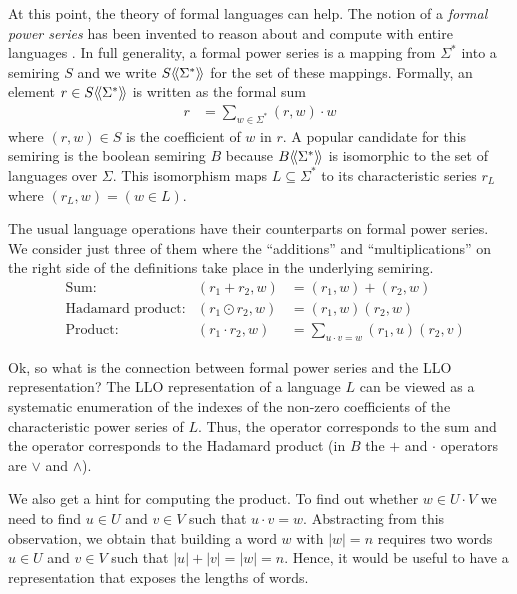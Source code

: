 At this point, the theory of formal languages can help. The notion of
a \emph{formal power series} has been invented to reason about and
compute with entire languages \cite{DBLP:books/daglib/0067812,DBLP:books/sp/KuichS86}. In full
generality, a formal power series is a mapping from $\Sigma^*$ into a
semiring $S$ and we write $S\langle\!\langle\Sigma^*\rangle\!\rangle$ for the set of these
mappings. Formally, an element $r \in S\langle\!\langle\Sigma^*\rangle\!\rangle$ is written as the
formal sum
\begin{align*}
  r &= \sum_{w \in \Sigma^*} (r,w) \cdot w
\end{align*}
where $(r,w) \in S$ is the coefficient of $w$ in $r$.
A popular candidate for this semiring is the boolean semiring $B$
because $B\langle\!\langle\Sigma^*\rangle\!\rangle$ is isomorphic to the set of languages over
$\Sigma$. This isomorphism maps $L\subseteq\Sigma^*$ to its
characteristic series $r_L$ where $(r_L, w) = (w \in L)$.

The usual language operations have their counterparts on formal power
series. We consider just three of them where the ``additions'' and ``multiplications'' on the
right side of the definitions take place in the underlying semiring.
\begin{align*}
  &\text{Sum:}
  & (r_1 + r_2, w) &= (r_1, w) + (r_2, w) \\
  &\text{Hadamard product:}
  &(r_1 \odot r_2, w) &= (r_1, w) (r_2, w) \\
  &\text{Product:}
  & (r_1 \cdot r_2, w) &= \sum_{u\cdot v=w} (r_1, u) (r_2,v) 
\end{align*}

Ok, so what is the connection between formal power series and the LLO
representation? The LLO representation of a language $L$ can be viewed as a systematic
enumeration of the indexes of the non-zero coefficients of the
characteristic power series of $L$. Thus, the  operator
corresponds to the sum and the  operator corresponds
to the Hadamard product (in $B$ the $+$ and $\cdot$ operators are
$\vee$ and $\wedge$). 

We also get a hint for computing the product. To find out whether $w
\in U \cdot V$ we need to find $u\in U$ and $v\in V$ such that $u\cdot
v = w$. Abstracting from this observation, we obtain that building a
word $w$ with $|w| = n$ requires two words $u\in U$ and $v\in V$ such that $|u| +
|v| = |w| = n$. Hence, it would be useful to have a representation
that exposes the lengths of words.

